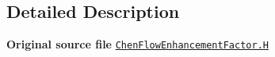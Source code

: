 \subsection{Detailed Description}
{\bfseries Original source file} \href{../../../home/carlo/data/GeN-Foam/GeN-Foam_ffn/GeN-Foam/GeN-Foam/classes/thermalHydraulics/src/physicsModels/heatTransferModels/FSHeatTransferCoefficientModels/subModels/flowEnhancementFactorModels/Chen/ChenFlowEnhancementFactor.H}{\tt Chen\+Flow\+Enhancement\+Factor.\+H} 